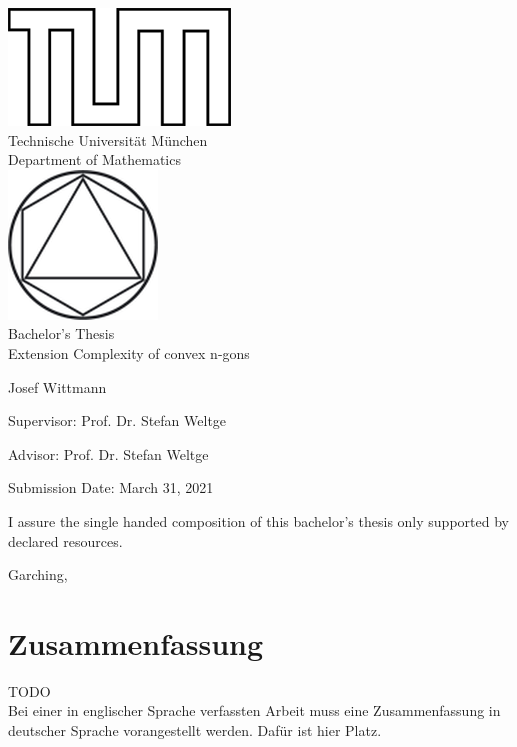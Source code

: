 \begin{titlepage}
\begin{center}
\includegraphics{assets/TUMlschwarz.png}\\[3mm]
\sf
{\Large
  Technische Universit\"at M\"unchen\\[5mm]
  Department of Mathematics\\[8mm]
}
\normalsize
\includegraphics{assets/TUMlMschwarz.png}\\[15mm]

Bachelor's Thesis\\[15mm]

{\Huge
  Extension Complexity of convex n-gons
}
\bigskip

\normalsize

Josef Wittmann
\end{center}
\vspace*{75mm}

Supervisor: Prof. Dr. Stefan Weltge
\medskip

Advisor: Prof. Dr. Stefan Weltge
\medskip

Submission Date: March 31, 2021

\end{titlepage}

\vspace*{150mm}

I assure the single handed composition of this bachelor's thesis only supported by declared resources.
\bigskip

Garching, 
\newpage

\section*{Zusammenfassung}
{\Huge TODO}\\
Bei einer in englischer Sprache verfassten Arbeit muss eine Zusammenfassung in deutscher Sprache vorangestellt werden.
Daf\"ur ist hier Platz.

\newpage